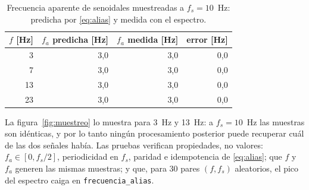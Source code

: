 \begin{table}[htbp]
  \centering
  \caption{Frecuencia aparente de senoidales muestreadas a $f_s=10$~Hz: predicha por
           \eqref{eq:alias} y medida con el espectro.}
  \label{tab:muestreo}
  \begin{tabular}{rrrr}
    \toprule
    $f$ [Hz] & $f_a$ predicha [Hz] & $f_a$ medida [Hz] & error [Hz] \\
    \midrule
    3  & 3,0 & 3,0 & 0,0 \\
    7  & 3,0 & 3,0 & 0,0 \\
    13 & 3,0 & 3,0 & 0,0 \\
    23 & 3,0 & 3,0 & 0,0 \\
    \bottomrule
  \end{tabular}
\end{table}


La figura~\ref{fig:muestreo} lo muestra para 3~Hz y 13~Hz: a $f_s=10$~Hz las muestras son idénticas, y por lo
tanto ningún procesamiento posterior puede recuperar cuál de las dos señales había. Las pruebas verifican
propiedades, no valores: $f_a\in[0,f_s/2]$, periodicidad en $f_s$, paridad e idempotencia de
\eqref{eq:alias}; que $f$ y $f_a$ generen las mismas muestras; y que, para 30 pares $(f,f_s)$ aleatorios,
el pico del espectro caiga en \texttt{frecuencia\_alias}.
